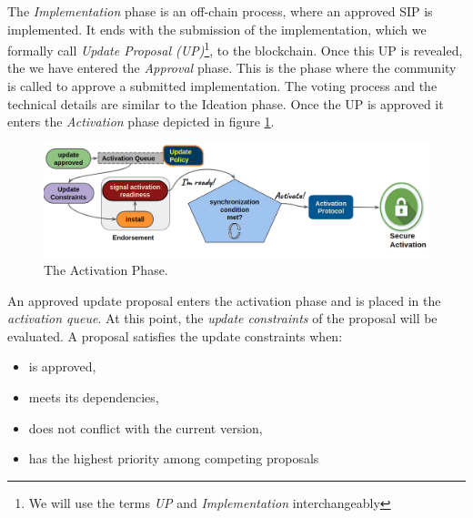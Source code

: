 The \emph{Implementation} phase is an off-chain process, where an approved SIP
is implemented. It ends with the submission of the implementation, which we
formally call \emph{Update Proposal (UP)}\footnote{We will use the terms
	\emph{UP} and \emph{Implementation} interchangeably}, to the blockchain. 
Once
this UP is
revealed, the we have entered the \emph{Approval} phase. This is the phase
where the community is called to approve a submitted implementation. The voting
process and the technical details are similar to the Ideation
phase. Once the
UP is approved it enters the \emph{Activation} phase depicted in figure
\ref{fig:activation_phase}.

\begin{figure}[h!] %
	\centering
	\includegraphics[width=0.8\columnwidth,
	keepaspectratio]{figures/activation_phase.png}
	\caption{The Activation Phase.}
	\label{fig:activation_phase}
\end{figure}

An approved update proposal enters the activation phase and is placed in the
\emph{activation queue}. At this point, the
\emph{update constraints} of the proposal will be evaluated. A proposal
satisfies the update constraints when:
\begin{itemize}
	\item is approved,
	\item meets its dependencies,
	\item does not conflict with the current version,
	\item has the highest priority among competing proposals
\end{itemize}

